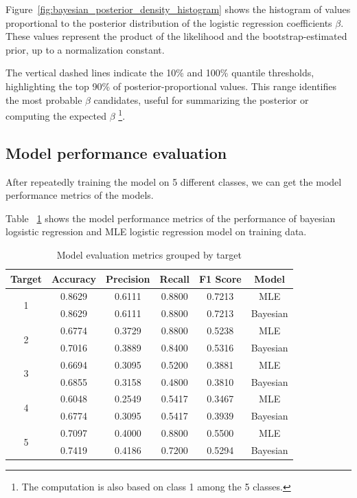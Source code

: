 Figure~\ref{fig:bayesian_posterior_density_histogram} shows the histogram of values proportional to the posterior distribution of the logistic regression coefficients $\beta$. These values represent the product of the likelihood and the bootstrap-estimated prior, up to a normalization constant.

The vertical dashed lines indicate the 10\% and 100\% quantile thresholds, 
highlighting the top 90\% of posterior-proportional values. 
This range identifies the most probable $\beta$ candidates,
 useful for summarizing the posterior or computing the expected $\beta$
 \footnote{The computation is also based on class 1 among the 5 classes.}.

\subsection{Model performance evaluation}

After repeatedly training the model on 5 different classes, we can get the 
model performance metrics of the models.

Table ~\ref{tab:metrics_train} shows the model performance metrics of the performance of bayesian logsistic regression  
and MLE logistic regression model on training data.

\begin{table}[!h]
    \centering
    \caption{Model evaluation metrics grouped by target}
    \label{tab:metrics_train}
    \begin{tabular}{cccccc}
    \toprule
    \textbf{Target} & \textbf{Accuracy} & \textbf{Precision} & \textbf{Recall} & \textbf{F1 Score} & \textbf{Model} \\
    \midrule
    \multirow{2}{*}{1} & 0.8629 & 0.6111 & 0.8800 & 0.7213 & MLE \\
                       & 0.8629 & 0.6111 & 0.8800 & 0.7213 & Bayesian \\
    \midrule
    \multirow{2}{*}{2} & 0.6774 & 0.3729 & 0.8800 & 0.5238 & MLE \\
                       & 0.7016 & 0.3889 & 0.8400 & 0.5316 & Bayesian \\
    \midrule
    \multirow{2}{*}{3} & 0.6694 & 0.3095 & 0.5200 & 0.3881 & MLE \\
                       & 0.6855 & 0.3158 & 0.4800 & 0.3810 & Bayesian \\
    \midrule
    \multirow{2}{*}{4} & 0.6048 & 0.2549 & 0.5417 & 0.3467 & MLE \\
                       & 0.6774 & 0.3095 & 0.5417 & 0.3939 & Bayesian \\
    \midrule
    \multirow{2}{*}{5} & 0.7097 & 0.4000 & 0.8800 & 0.5500 & MLE \\
                       & 0.7419 & 0.4186 & 0.7200 & 0.5294 & Bayesian \\
    \bottomrule
    \end{tabular}
\end{table}

